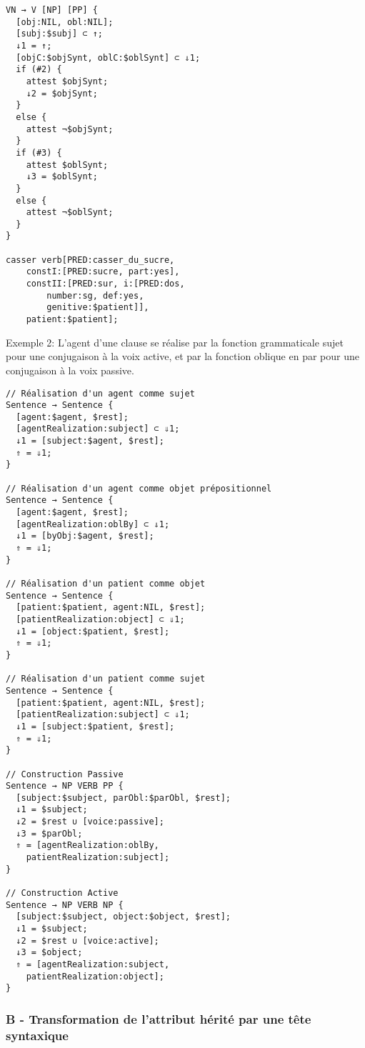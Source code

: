\documentclass[11pt]{article}
\begin{document}
\begin{lstlisting}
VN → V [NP] [PP] {
  [obj:NIL, obl:NIL];
  [subj:$subj] ⊂ ↑;
  ↓1 = ↑;
  [objC:$objSynt, oblC:$oblSynt] ⊂ ⇓1;
  if (#2) {
    attest $objSynt;
    ↓2 = $objSynt;
  }
  else {
    attest ¬$objSynt;
  }
  if (#3) {
    attest $oblSynt;
    ↓3 = $oblSynt;
  }
  else {
    attest ¬$oblSynt;
  }
}

casser verb[PRED:casser_du_sucre, 
	constI:[PRED:sucre, part:yes],
	constII:[PRED:sur, i:[PRED:dos, 
		number:sg, def:yes, 
		genitive:$patient]],
	patient:$patient];
\end{lstlisting}


Exemple 2:
L'agent d'une clause se réalise par la fonction grammaticale sujet
pour une conjugaison à la voix active, et par la fonction oblique en
\og par\fg{} pour une conjugaison à la voix passive.

\begin{lstlisting}
// Réalisation d'un agent comme sujet
Sentence → Sentence {
  [agent:$agent, $rest];
  [agentRealization:subject] ⊂ ⇓1;
  ↓1 = [subject:$agent, $rest];
  ⇑ = ⇓1;
}

// Réalisation d'un agent comme objet prépositionnel
Sentence → Sentence {
  [agent:$agent, $rest];
  [agentRealization:oblBy] ⊂ ⇓1;
  ↓1 = [byObj:$agent, $rest];
  ⇑ = ⇓1;
}

// Réalisation d'un patient comme objet
Sentence → Sentence {
  [patient:$patient, agent:NIL, $rest];
  [patientRealization:object] ⊂ ⇓1;
  ↓1 = [object:$patient, $rest];
  ⇑ = ⇓1;
}

// Réalisation d'un patient comme sujet
Sentence → Sentence {
  [patient:$patient, agent:NIL, $rest];
  [patientRealization:subject] ⊂ ⇓1;
  ↓1 = [subject:$patient, $rest];
  ⇑ = ⇓1;
}

// Construction Passive 
Sentence → NP VERB PP {
  [subject:$subject, parObl:$parObl, $rest];
  ↓1 = $subject;
  ↓2 = $rest ∪ [voice:passive];
  ↓3 = $parObl;
  ⇑ = [agentRealization:oblBy, 
	patientRealization:subject];
}

// Construction Active
Sentence → NP VERB NP {
  [subject:$subject, object:$object, $rest];
  ↓1 = $subject;
  ↓2 = $rest ∪ [voice:active];
  ↓3 = $object;
  ⇑ = [agentRealization:subject, 
	patientRealization:object];
}
\end{lstlisting}

\subsubsection*{B - Transformation de l'attribut hérité par une tête syntaxique}
\end{document}
